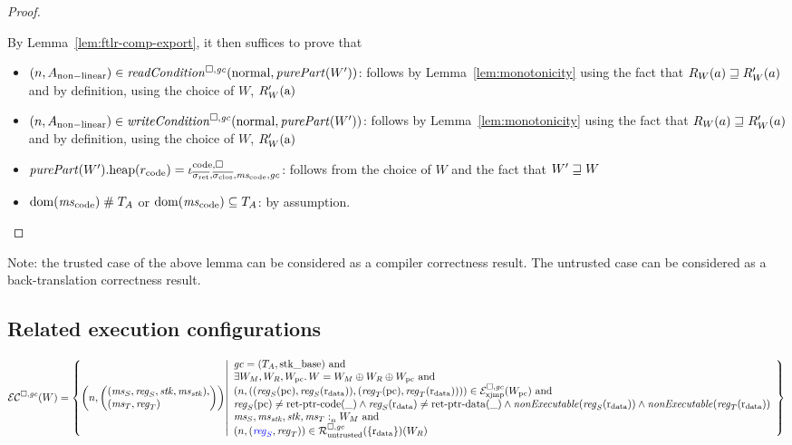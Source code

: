 \documentclass[a4paper]{article}
\begin{document}
\begin{proof}
\begin{itemize}
    By Lemma~\ref{lem:ftlr-comp-export}, it then suffices to prove that
    \begin{itemize}
    \item $\npair{A_{\mathrm{non-linear}}} \in \readCond{}(\normal,\purePart{W'})$: follows by Lemma~\ref{lem:monotonicity} using the fact that $R_W(a) \sqsupseteq R_W'(a)$ and by definition, using the choice of $W$, $R_W'(\mathrm{a})$ 
    \item $\npair{A_{\mathrm{non-linear}}} \in \writeCond{}(\normal,\purePart{W'})$: follows by Lemma~\ref{lem:monotonicity} using the fact that $R_W(a) \sqsupseteq R_W'(a)$ and by definition, using the choice of $W$, $R_W'(\mathrm{a})$ 
    \item $\pwheap[\purePart{W'}](r_{\mathrm{code}}) = \codereg{\sigrets,\sigcloss,\mscode,\gc}$: follows from the choice of $W$ and the fact that $W' \sqsupseteq W$
    \item $\dom(\mscode) \mathrel{\#} \ta$ or $\dom(\mscode) \subseteq \ta$: by assumption.
    \end{itemize}
  \end{itemize}
\end{proof}

Note: the trusted case of the above lemma can be considered as a compiler correctness result.
The untrusted case can be considered as a back-translation correctness result.

\subsection{Related execution configurations}
\label{sec:related-exec-confs}

\[
  \lrec(W) = \left\{ \npair{\left(
        \arraycolsep=0pt\array{l}
        (\ms_S,\reg_S,\stk,\ms_\stk),\\
        (\ms_T,\reg_T)\endarray\right)} \middle|
    \begin{array}{l}
      \gc = (\ta,\stkb) \tand\\
      \exists W_M,W_R,W_\pcreg \ldotp W = W_M \oplus W_R \oplus W_\pcreg \tand\\
      \npair{( (\reg_S(\pcreg),\reg_S(\rdata)), (\reg_T(\pcreg),\reg_T(\rdata)) )} \in \lrexj(W_\pcreg) \tand \\
      \reg_S(\pcreg) \neq \retptrc(\_) \wedge 
      \reg_S(\rdata) \neq \retptrd(\_) \wedge 
      \nonExec{\reg_S(\rdata)} \wedge
      \nonExec{\reg_T(\rdata)}\\
      \memSat{\ms_S,\ms_\stk,\stk,\ms_T}{W_M} \tand\\
      \npair{\stpair{\reg}{\reg}} \in \lrr(\{\rdata\})(W_R)
    \end{array}
            \right\}
\]
\end{document}
